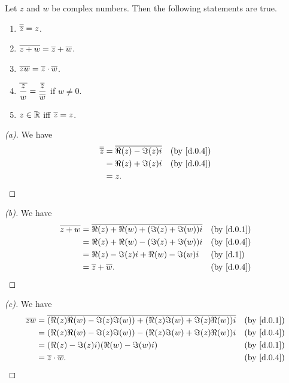 \begin{thm}\label{d.2}
  Let \(z\) and \(w\) be complex numbers.
  Then the following statements are true.
  \begin{enumerate}
    \item \(\overline{\overline{z}} = z\).
    \item \(\overline{z + w} = \overline{z} + \overline{w}\).
    \item \(\overline{zw} = \overline{z} \cdot \overline{w}\).
    \item \(\overline{\dfrac{z}{w}} = \dfrac{\overline{z}}{\overline{w}}\) if \(w \neq 0\).
    \item \(z \in \mathbb{R}\) iff \(\overline{z} = z\).
  \end{enumerate}
\end{thm}

\begin{proof}[(a)]
  We have
  \begin{align*}
    \conj{\conj{z}} & = \conj{\Re(z) - \Im(z) i} &  & \by{d.0.4} \\
                    & = \Re(z) + \Im(z) i        &  & \by{d.0.4} \\
                    & = z.
  \end{align*}
\end{proof}

\begin{proof}[(b)]
  We have
  \begin{align*}
    \conj{z + w} & = \conj{\Re(z) + \Re(w) + (\Im(z) + \Im(w)) i} &  & \by{d.0.1} \\
                 & = \Re(z) + \Re(w) - (\Im(z) + \Im(w)) i        &  & \by{d.0.4} \\
                 & = \Re(z) - \Im(z) i + \Re(w) - \Im(w) i        &  & \by{d.1}   \\
                 & = \conj{z} + \conj{w}.                         &  & \by{d.0.4}
  \end{align*}
\end{proof}

\begin{proof}[(c)]
  We have
  \begin{align*}
    \conj{zw} & = \conj{(\Re(z) \Re(w) - \Im(z) \Im(w)) + (\Re(z) \Im(w) + \Im(z) \Re(w)) i} &  & \by{d.0.1} \\
              & = (\Re(z) \Re(w) - \Im(z) \Im(w)) - (\Re(z) \Im(w) + \Im(z) \Re(w)) i        &  & \by{d.0.4} \\
              & = (\Re(z) - \Im(z) i) (\Re(w) - \Im(w) i)                                    &  & \by{d.0.1} \\
              & = \conj{z} \cdot \conj{w}.                                                   &  & \by{d.0.4}
  \end{align*}
\end{proof}

